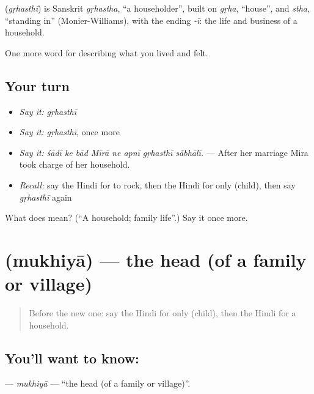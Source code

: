 \begin{cousinweb}
\textbf{} (\emph{gṛhasthī}) is Sanskrit \emph{gṛhastha}, \textquotedblleft{}a householder\textquotedblright{}, built on \emph{gṛha}, \textquotedblleft{}house\textquotedblright{}, and \emph{stha}, \textquotedblleft{}standing in\textquotedblright{} (Monier-Williams), with the ending \emph{-ī}: the life and business of a household.
\end{cousinweb}

\begin{grammarlens}[title={What you've built}]
One more word for describing what you lived and felt.
\end{grammarlens}

\subsection*{Your turn}
\begin{itemize}
\raggedright
  \item \emph{Say it:} \emph{gṛhasthī}
  \item \emph{Say it:} \emph{gṛhasthī}, once more
  \item \emph{Say it:} \emph{śādī ke bād Mīrā ne apnī gṛhasthī sãbhālī.} — After her marriage Mira took charge of her household.
  \item \emph{Recall:} say the Hindi for to rock, then the Hindi for only (child), then say \emph{gṛhasthī} again
\end{itemize}

\begin{tcolorbox}[breakable,colback=teal!4,colframe=teal!35!black,title={Before you move on}]
What does  mean? (\textquotedblleft{}A household; family life\textquotedblright{}.) Say it once more.
\end{tcolorbox}
\section[\texorpdfstring{\hi{मुखिया} (mukhiyā)}{मुखिया (mukhiyā)}]{ (mukhiyā) — the head (of a family or village)}

\label{lesson:HI-C503-mukhiya}



\begin{quote}
Before the new one: say the Hindi for only (child), then the Hindi for a household.
\end{quote}

\subsection*{You'll want to know: }
\textbf{} — \emph{mukhiyā} — \textquotedblleft{}the head (of a family or village)\textquotedblright{}.

